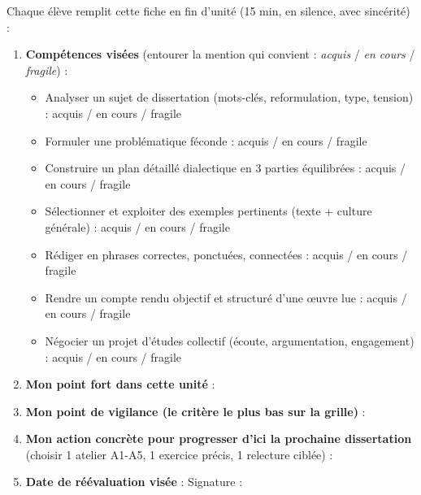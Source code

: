 \documentclass[11pt]{article}
\begin{document}
\begin{methode}
Chaque élève remplit cette fiche en fin d'unité (15 min, en silence, avec sincérité) :

\begin{enumerate}
    \item \textbf{Compétences visées} (entourer la mention qui convient : \emph{acquis} / \emph{en cours} / \emph{fragile}) :
    \begin{itemize}
        \item Analyser un sujet de dissertation (mots-clés, reformulation, type, tension) : acquis / en cours / fragile
        \item Formuler une problématique féconde : acquis / en cours / fragile
        \item Construire un plan détaillé dialectique en 3 parties équilibrées : acquis / en cours / fragile
        \item Sélectionner et exploiter des exemples pertinents (texte + culture générale) : acquis / en cours / fragile
        \item Rédiger en phrases correctes, ponctuées, connectées : acquis / en cours / fragile
        \item Rendre un compte rendu objectif et structuré d'une œuvre lue : acquis / en cours / fragile
        \item Négocier un projet d'études collectif (écoute, argumentation, engagement) : acquis / en cours / fragile
    \end{itemize}
    \item \textbf{Mon point fort dans cette unité} : \underline{\hspace{8cm}}
    \item \textbf{Mon point de vigilance (le critère le plus bas sur la grille)} : \underline{\hspace{8cm}}
    \item \textbf{Mon action concrète pour progresser d'ici la prochaine dissertation} (choisir 1 atelier A1-A5, 1 exercice précis, 1 relecture ciblée) : \underline{\hspace{8cm}}
    \item \textbf{Date de réévaluation visée} : \underline{\hspace{3cm}} \quad Signature : \underline{\hspace{4cm}}
\end{enumerate}
\end{methode}
\end{document}

